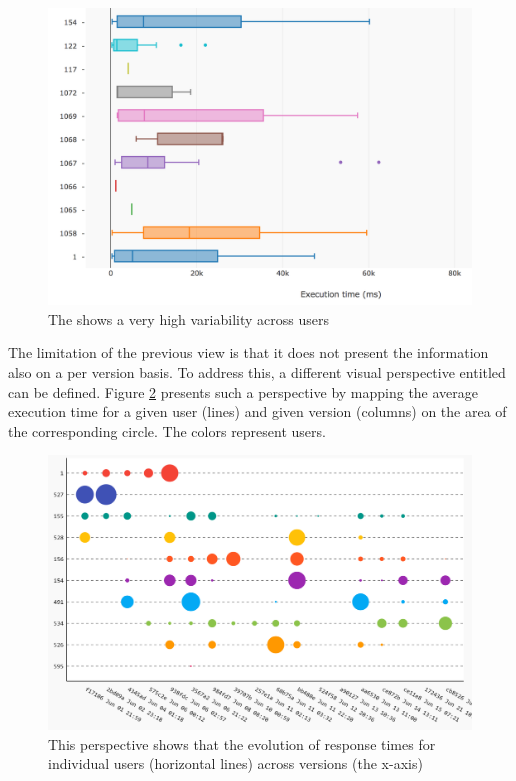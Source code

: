 \documentclass[conference]{IEEEtran}
\begin{document}
  \begin{figure}[!ht]
    \centering
    \includegraphics[width=\linewidth]{time_per_user}
    \caption{The \epFeedItems shows a very high variability across users}
    \label{fig:tpu}
  \end{figure}

  \newpage
  \niceseparator

  The limitation of the previous view is that it does not present the information also on a per version basis. To address this, a different visual perspective entitled  can be defined. Figure \ref{fig:tuv} presents such a perspective by mapping the average execution time for a given user (lines) and given version (columns) on the area of the corresponding circle. The colors represent users.

  \begin{figure}[!ht]
    \centering
    \includegraphics[width=\linewidth]{time_per_user_per_version}
    \caption{This perspective shows that the evolution of response times for individual users (horizontal lines) across versions (the x-axis)}
    \label{fig:tuv}
  \end{figure}
\end{document}
